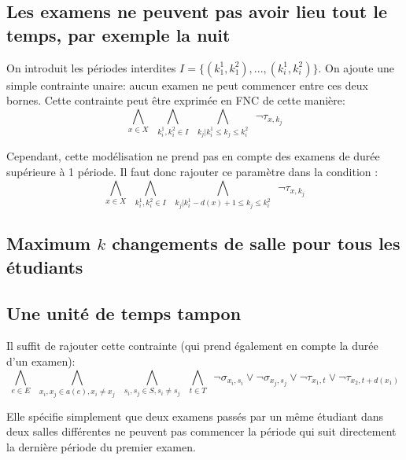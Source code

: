 \documentclass[a4paper]{article}
\begin{document}
\subsection{Les examens ne peuvent pas avoir lieu tout le temps, par exemple la nuit}
On introduit les périodes interdites $I = \{(k_1^1, k_1^2), ..., (k_{i}^{1},k_{i}^{2})\}$.
On ajoute une simple contrainte unaire: aucun examen ne peut commencer entre ces deux bornes. Cette contrainte peut être exprimée en FNC de cette manière:
$$ \bigwedge\limits_{x \in X} \,\,\,
  \bigwedge\limits_{k_i^1, k_i^2 \in I}\,\,\,
  \bigwedge\limits_{k_j | k_i^1 \leq k_j \leq k_i^2} \,\,\,
  \lnot \tau_{x,k_j}$$

Cependant, cette modélisation ne prend pas en compte des examens de durée supérieure à 1 période. Il faut donc rajouter ce paramètre dans la condition :
$$ \bigwedge\limits_{x \in X} \,\,\,
  \bigwedge\limits_{k_i^1, k_i^2 \in I}\,\,\,
  \bigwedge\limits_{k_j | k_i^1-d(x)+1 \leq k_j \leq k_i^2} \,\,\,
  \lnot \tau_{x,k_j}$$

\subsection{Maximum $k$ changements de salle pour tous les étudiants}

\subsection{Une unité de temps tampon}
  Il suffit de rajouter cette contrainte (qui prend également en compte la durée d'un examen):
  $$  \bigwedge\limits_{e \in E} \,\,\,
      \bigwedge\limits_{x_i, x_j \in a(e), x_i \neq x_j} \,\,\,
      \bigwedge\limits_{s_i, s_j \in S, s_i \neq s_j} \,\,\,
      \bigwedge\limits_{t \in T} \,\,\,
      \lnot \sigma_{x_i, s_i} \lor \lnot \sigma_{x_j, s_j}
      \lor \lnot \tau_{x_1, t} \lor \lnot \tau_{x_2, t+d(x_1)} $$

  Elle spécifie simplement que deux examens passés par un même étudiant dans deux salles différentes ne peuvent pas commencer la période qui suit directement la dernière période du premier examen.
\end{document}
